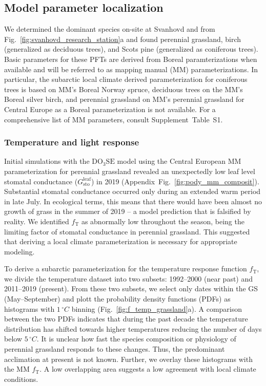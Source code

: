 \documentclass[bg, manuscript]{copernicus}
\begin{document}
\subsection{Model parameter localization}
\label{sec:localization}

We determined the dominant species on-site at Svanhovd and from Fig.~\ref{fig:svanhovd_research_station}a and found perennial grassland, birch (generalized as deciduous trees), and Scots pine (generalized as coniferous trees). Basic parameters for these PFTs are derived from Boreal paramterizations when available \citep{EP:Simpson2007,GCB:Mills2011,ICP:MappingManual2017} and will be referred to as mapping manual (MM) parameterizations. In particular, the subarctic local climate derived parameterization for coniferous trees is based on MM's Boreal Norway spruce, deciduous trees on the MM's Boreal silver birch, and perennial grassland on MM's perennial grassland for Central Europe as a Boreal parameterization is not available. For a comprehensive list of MM parameters, consult Supplement~Table~S1.

\subsubsection{Temperature and light response}

Initial simulations with the $\mathrm{DO_3SE}$ model using the Central European MM parameterization for perennial grassland revealed an unexpectedly low leaf level stomatal conductance ($G_\mathrm{sto}^\mathrm{leaf}$) in 2019 (Appendix~Fig.~\ref{fig:pody_mm_composit}). Substantial stomatal conductance occurred only during an extended warm period in late July. In ecological terms, this means that there would have been almost no growth of grass in the summer of 2019 -- a model prediction that is falsified by reality. We identified $f_\mathrm{T}$ as abnormally low throughout the season, being the limiting factor of stomatal conductance in perennial grassland. This suggested that deriving a local climate parameterization is necessary for appropriate modeling.

To derive a subarctic parameterization for the temperature response function $f_\mathrm{T}$, we divide the temperature dataset into two subsets: 1992--2000 (near past) and 2011--2019 (present). From these two subsets, we select only dates within the GS (May--September) and plott the probability density functions (PDFs) as histograms with $1\,\unit{^\circ C}$ binning (Fig.~\ref{fig:f_temp_grassland}a). A comparison between the two PDFs indicates that during the past decade the temperature distribution has shifted towards higher temperatures reducing the number of days below $5\,\unit{^\circ C}$. It is unclear how fast the species composition or physiology of perennial grassland responds to these changes. Thus, the predominant acclimation at present is not known. Further, we overlay these histograms with the MM $f_\mathrm{T}$. A low overlapping area suggests a low agreement with local climate conditions. 
\end{document}
